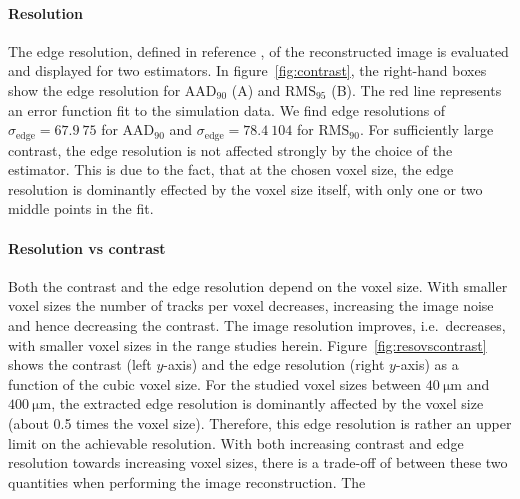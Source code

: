 \documentclass{PoS}
\newcommand{\sigmaedge}{\ensuremath{\sigma_{\textrm{edge}}}}
\newcommand{\rmsninetyfive}{\ensuremath{\textrm{RMS}_\textrm{95}}}
\newcommand{\rmsninety}{\ensuremath{\textrm{RMS}_\textrm{90}}}
\newcommand{\aadninety}{\ensuremath{\textrm{AAD}_\textrm{90}}}
\begin{document}
\paragraph{Resolution}

The edge resolution, defined in reference \cite{JansenAPl}, of the reconstructed image is evaluated and displayed for two estimators. 
In figure~\ref{fig:contrast}, the right-hand boxes show the edge resolution for $\aadninety$ (A) and $\rmsninetyfive$ (B).
The red line represents an error function fit to the simulation data. 
We find edge resolutions of $\sigmaedge = \SI{67.9}{75}$ for $\aadninety$ and $\sigmaedge = \SI{78.4}{104}$ for $\rmsninety$. 
For sufficiently large contrast, the edge resolution is not affected strongly by the choice of the estimator. 
This is due to the fact, that at the chosen voxel size, the edge resolution is dominantly effected by the voxel size itself, with only one or two middle points in the fit.  


\paragraph{Resolution vs contrast}

Both the contrast and the edge resolution depend on the voxel size. 
With smaller voxel sizes the number of tracks per voxel decreases, increasing the image noise and hence decreasing the contrast.
The image resolution improves, i.e.\ decreases, with smaller voxel sizes in the range studies herein. 
Figure~\ref{fig:resovscontrast} shows the contrast (left $y$-axis) and the edge resolution (right $y$-axis) as a function of the cubic voxel size.
For the studied voxel sizes between $\SI{40}{\um}$ and $\SI{400}{\um}$, the extracted edge resolution is dominantly affected by the voxel size (about 0.5 times the voxel size). 
Therefore, this edge resolution is rather an upper limit on the achievable resolution. 
With both increasing contrast and edge resolution towards increasing voxel sizes, there is a trade-off of between these two quantities when performing the image reconstruction. 
The
\end{document}
